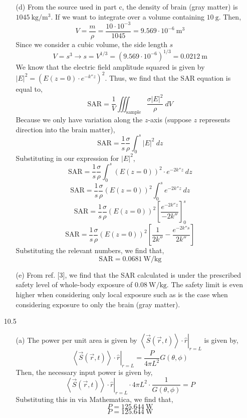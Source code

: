 \documentclass[12pt]{article}
\begin{document}
\begin{enumerate}
\begin{enumerate}
		\item [(d)]
		From the source used in part c, the density of brain (gray matter) is $1045\:\mathrm{kg/m^3}$.
		If we want to integrate over a volume containing $10\:\mathrm{g}$.
		Then, 
		\[V=\frac{m}{\rho}=\frac{10\cdot 10^{-3}}{1045}=9.569\cdot 10^{-6}\:\mathrm{m}^3\]
		Since we consider a cubic volume, the side length $s$
		\[V=s^3\to s=V^{1/3}=(9.569\cdot 10^{-6})^{1/3}=0.0212\:\mathrm{m}\]
		We know that the electric field amplitude squared is given by $|E|^2 = (E(z=0)\cdot e^{-k''z})^2$.
		Thus, we find that the SAR equation is equal to,
		\[\mathrm{SAR}= \frac{1}{V}\iiint_{\mathrm{sample}}\frac{\sigma|E|^2}{\rho}\:dV\]
		Because we only have variation along the $z$-axis (suppose $z$ represents direction into the brain matter),
		\[\mathrm{SAR}=\frac{1}{s}\frac{\sigma}{\rho}\int_0^s|E|^2\:dz\]
		Substituting in our expression for $|E|^2$,
		\[\mathrm{SAR}=\frac{1}{s}\frac{\sigma}{\rho}\int_0^s(E(z=0))^2\cdot e^{-2k''z}\:dz\]
		\[\mathrm{SAR}=\frac{1}{s}\frac{\sigma}{\rho}(E(z=0))^2\int_0^se^{-2k''z}\:dz\]
		\[\mathrm{SAR}=\frac{1}{s}\frac{\sigma}{\rho}(E(z=0))^2\left[\frac{e^{-2k''z}}{-2k''}\right]_0^s\]
		\[\mathrm{SAR}=\frac{1}{s}\frac{\sigma}{\rho}(E(z=0))^2\left[\frac{1}{2k''}-\frac{e^{-2k''s}}{2k''}\right]\]
		Substituting the relevant numbers, we find that,
		\[\boxed{\mathrm{SAR}=0.0681\:\mathrm{W/kg}}\]

		\item [(e)]
		From ref. [3], we find that the SAR calculated is under the prescribed safety level of whole-body exposure of $0.08\:\mathrm{W/kg}$.
		The safety limit is even higher when considering only local exposure such as is the case when considering exposure to only the brain (gray matter).
	\end{enumerate}

	\item [10.5]
	\begin{enumerate}
		\item [(a)]
		The power per unit area is given by $\left.\left \langle \vec S(\vec r, t)\right \rangle \cdot \hat r\right|_{r=L}$ is given by,
		\[\left.\left \langle \vec S(\vec r, t)\right \rangle \cdot \hat r\right|_{r=L}=\frac{P}{4\pi L^2}G(\theta,\phi)\]
		Then, the necessary input power is given by,
		\[\left.\left \langle \vec S(\vec r, t)\right \rangle \cdot \hat r\right|_{r=L}\cdot 4\pi L^2 \cdot\frac{1}{G(\theta,\phi)}=P\]
		Substituting this in via Mathematica, we find that,
		\[P=125.644\:\mathrm{W}\]
		\[\boxed{P=125.644\:\mathrm{W}}\]


\end{enumerate}
\end{enumerate}
\end{document}
